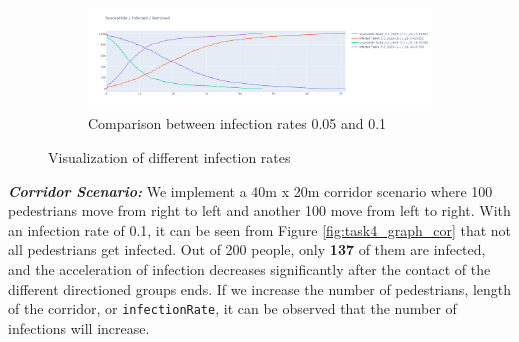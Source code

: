 \begin{figure}[H]\ContinuedFloat



   \begin{subfigure}{\textwidth}
\includegraphics[width=\textwidth]{images/task4.5_2_simulation.png}
 \caption{Comparison between infection rates 0.05 and 0.1}
    \label{fig:task4.5_2_visualization}
\end{subfigure}
    \caption{Visualization of different infection rates}
    \label{fig:task4.5_Visualization}
\end{figure}


 \textit{\textbf{Corridor Scenario:}} We implement a 40m x 20m corridor scenario where 100 pedestrians move from right to left and another 100 move from left to right. With an infection rate of 0.1, it can be seen from Figure \ref{fig:task4_graph_cor} that not all pedestrians get infected. Out of 200 people, only \textbf{137} of them are infected, and the acceleration of infection decreases significantly after the contact of the different directioned groups ends. If we increase the number of pedestrians, length of the corridor, or \texttt{infectionRate}, it can be observed that the number of infections will increase.
 
